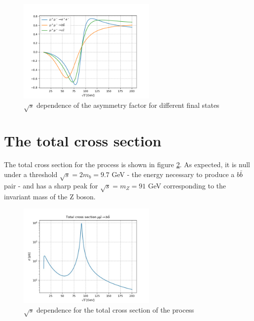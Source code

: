 \documentclass[12pt,letterpaper]{article}
\begin{document}
\begin{figure}
\centering
\includegraphics[width=0.6\textwidth]{figures/Compare_asymm.png}
\caption{$\sqrt{s}$ dependence of the asymmetry factor for different final states}
\label{asymm_compare}
\end{figure}


\section{The total cross section}

The total cross section for the process is shown in figure \ref{totalCS}. 
As expected, it is null under a threshold $\sqrt{s}=2m_{b} = 9.7$ GeV - the energy necessary to produce a $b\bar{b}$ pair - and has a sharp peak for $\sqrt{s}=m_{Z} = 91$ GeV corresponding to the invariant mass of the Z boson. \\
 

\begin{figure}[!ht]
\centering
\includegraphics[width=0.6\textwidth]{figures/totalCS.jpg}
\caption{$\sqrt{s}$ dependence for the total cross section of the process }
\label{totalCS}
\end{figure}
\end{document}
